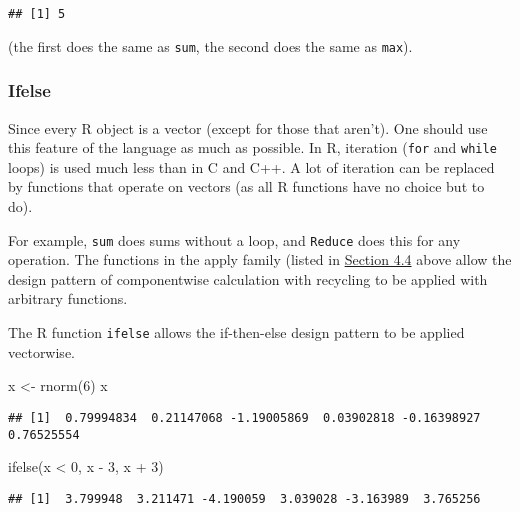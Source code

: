 \documentclass[
]{article}
\newenvironment{Shaded}{\begin{snugshade}}{\end{snugshade}}
\newcommand{\DecValTok}[1]{\textcolor[rgb]{0.00,0.00,0.81}{#1}}
\newcommand{\FunctionTok}[1]{\textcolor[rgb]{0.00,0.00,0.00}{#1}}
\newcommand{\NormalTok}[1]{#1}
\newcommand{\OtherTok}[1]{\textcolor[rgb]{0.56,0.35,0.01}{#1}}
\newcommand{\SpecialCharTok}[1]{\textcolor[rgb]{0.00,0.00,0.00}{#1}}
\begin{document}
\begin{verbatim}
## [1] 5
\end{verbatim}

(the first does the same as \texttt{sum}, the second does the same as
\texttt{max}).

\hypertarget{ifelse}{%
\subsubsection{Ifelse}\label{ifelse}}

Since every R object is a vector (except for those that aren't). One
should use this feature of the language as much as possible. In R,
iteration (\texttt{for} and \texttt{while} loops) is used much less than
in C and C++. A lot of iteration can be replaced by functions that
operate on vectors (as all R functions have no choice but to do).

For example, \texttt{sum} does sums without a loop, and \texttt{Reduce}
does this for any operation. The functions in the apply family (listed
in \protect\hyperlink{functions-as-arguments-to-functions}{Section 4.4}
above allow the design pattern of componentwise calculation with
recycling to be applied with arbitrary functions.

The R function \texttt{ifelse} allows the if-then-else design pattern to
be applied vectorwise.

\begin{Shaded}
\begin{Highlighting}[]
\NormalTok{x }\OtherTok{\textless{}{-}} \FunctionTok{rnorm}\NormalTok{(}\DecValTok{6}\NormalTok{)}
\NormalTok{x}
\end{Highlighting}
\end{Shaded}

\begin{verbatim}
## [1]  0.79994834  0.21147068 -1.19005869  0.03902818 -0.16398927  0.76525554
\end{verbatim}

\begin{Shaded}
\begin{Highlighting}[]
\FunctionTok{ifelse}\NormalTok{(x }\SpecialCharTok{\textless{}} \DecValTok{0}\NormalTok{, x }\SpecialCharTok{{-}} \DecValTok{3}\NormalTok{, x }\SpecialCharTok{+} \DecValTok{3}\NormalTok{)}
\end{Highlighting}
\end{Shaded}

\begin{verbatim}
## [1]  3.799948  3.211471 -4.190059  3.039028 -3.163989  3.765256
\end{verbatim}
\end{document}
